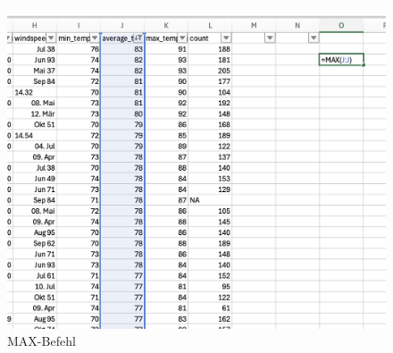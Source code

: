 \documentclass{article}
\begin{document}
\begin{figure} [h]
    \centering
    \includegraphics[width=0.8\linewidth]{Excel MAX.png}
    \caption{MAX-Befehl}
    \label{fig:Befehle}
\end{figure}
\end{document}
